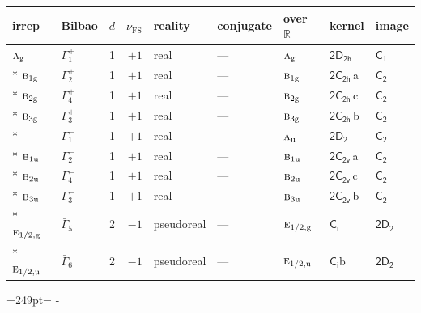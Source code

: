 \documentclass[10pt,a4paper]{article}
\makeatletter
\def\grouprule#1#2{\noalign{\marks\LTgroupmarks{\the\belowrulesep}\nobreak\vskip#1%
  \vskip\aboverulesep}\multispan\LT@cols\unskip{\leaders\hrule\@height#2\hfill\kern\z@}\cr
  \noalign{\penalty\LTrulebreak\vskip\belowrulesep\global\@lastruleclass\z@}}
\newcommand{\needspace}[1]{\par\penalty-100\begingroup\dimen0=#1\relax\dimen2=\pagegoal
  \advance\dimen2-\pagetotal\ifdim\dimen0>\dimen2\relax\ifdim\dimen2>0pt\vfil\break\fi\fi
  \endgroup}
\numberwithin{equation}{section}
\newcommand{\grp}[1]{\mathsf{#1}}
\newcommand{\irr}[1]{\text{\normalfont\scshape #1}}
\newcommand{\detbox}[1]{{\setlength{\fboxsep}{1pt}\fbox{#1}}}
\newcommand{\ptag}[1]{\mathrm{#1}}
\newcommand{\clsletter}[1]{\,{\scriptsize\color{black!55}#1}}
\newcommand{\fsind}{\nu_{\mathrm{FS}}}
\newcommand{\secondclass}{\mathrm{b}}
\makeatother
\begin{document}
{\small\renewcommand{\arraystretch}{1.25}\setlength{\tabcolsep}{4pt}\begin{longtable}{@{}llrrlllll@{}}\toprule
irrep & Bilbao & $d$ & $\fsind$ & reality & conjugate & over $\mathbb{R}$ & kernel & image\\\midrule\endhead
\bottomrule\endfoot\endlastfoot
$\irr{a}_{\ptag{g}}$ & $\Gamma_{1}^{+}$ & 1 & $+1$ & real & --- & $\irr{a}_{\ptag{g}}$ & \href{2D2h.pdf}{$\grp{2D_{2h}}$} & \href{../../../rotation/data/pdf/C1.pdf}{$\grp{C_{1}}$}\\*
$\irr{b}_{1\ptag{g}}$ & $\Gamma_{2}^{+}$ & 1 & $+1$ & real & --- & $\irr{b}_{1\ptag{g}}$ & \href{2C2h.pdf}{$\grp{2C_{2h}}$}\clsletter{a} & \href{../../../rotation/data/pdf/C2.pdf}{$\grp{C_{2}}$}\\*
$\irr{b}_{2\ptag{g}}$ & $\Gamma_{4}^{+}$ & 1 & $+1$ & real & --- & $\irr{b}_{2\ptag{g}}$ & \href{2C2h.pdf}{$\grp{2C_{2h}}$}\clsletter{c} & \href{../../../rotation/data/pdf/C2.pdf}{$\grp{C_{2}}$}\\*
$\irr{b}_{3\ptag{g}}$ & $\Gamma_{3}^{+}$ & 1 & $+1$ & real & --- & $\irr{b}_{3\ptag{g}}$ & \href{2C2h.pdf}{$\grp{2C_{2h}}$}\clsletter{b} & \href{../../../rotation/data/pdf/C2.pdf}{$\grp{C_{2}}$}\\*
\detbox{$\irr{a}_{\ptag{u}}$} & $\Gamma_{1}^{-}$ & 1 & $+1$ & real & --- & $\irr{a}_{\ptag{u}}$ & \href{2D2.pdf}{$\grp{2D_{2}}$} & \href{../../../rotation/data/pdf/C2.pdf}{$\grp{C_{2}}$}\\*
$\irr{b}_{1\ptag{u}}$ & $\Gamma_{2}^{-}$ & 1 & $+1$ & real & --- & $\irr{b}_{1\ptag{u}}$ & \href{2C2v.pdf}{$\grp{2C_{2v}}$}\clsletter{a} & \href{../../../rotation/data/pdf/C2.pdf}{$\grp{C_{2}}$}\\*
$\irr{b}_{2\ptag{u}}$ & $\Gamma_{4}^{-}$ & 1 & $+1$ & real & --- & $\irr{b}_{2\ptag{u}}$ & \href{2C2v.pdf}{$\grp{2C_{2v}}$}\clsletter{c} & \href{../../../rotation/data/pdf/C2.pdf}{$\grp{C_{2}}$}\\*
$\irr{b}_{3\ptag{u}}$ & $\Gamma_{3}^{-}$ & 1 & $+1$ & real & --- & $\irr{b}_{3\ptag{u}}$ & \href{2C2v.pdf}{$\grp{2C_{2v}}$}\clsletter{b} & \href{../../../rotation/data/pdf/C2.pdf}{$\grp{C_{2}}$}\\*
\grouprule{0pt}{\lightrulewidth}
$\irr{e}_{1/2,\ptag{g}}$ & $\bar{\Gamma}_{5}$ & 2 & $-1$ & pseudoreal & --- & $\irr{e}_{1/2,\ptag{g}}$ & \href{S2.pdf}{$\grp{C_{i}}$} & \href{2D2.pdf}{$\grp{2D_{2}}$}\\*
$\irr{e}_{1/2,\ptag{u}}$ & $\bar{\Gamma}_{6}$ & 2 & $-1$ & pseudoreal & --- & $\irr{e}_{1/2,\ptag{u}}$ & \href{S2b.pdf}{$\grp{C_{i}}\secondclass$} & \href{2D2.pdf}{$\grp{2D_{2}}$}\\
\bottomrule\end{longtable}}
\needspace{249pt}
\end{document}

